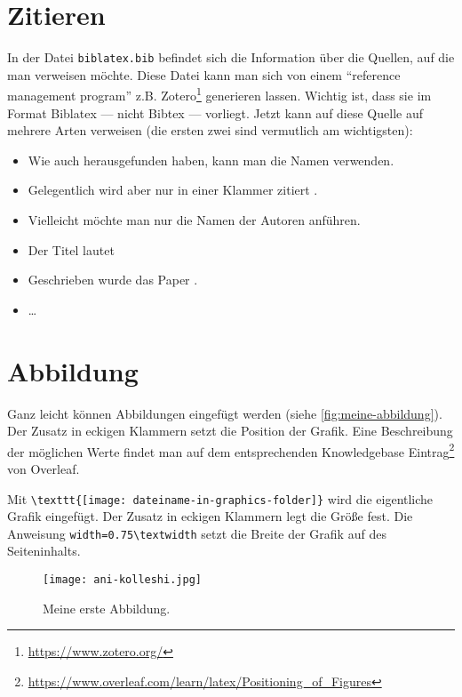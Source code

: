\section{Zitieren}

In der Datei \verb|biblatex.bib| befindet sich die Information über die Quellen, auf die man verweisen möchte. Diese Datei kann man sich von einem ``reference management program'' z.B. Zotero\footnote{\href{https://www.zotero.org/}{https://www.zotero.org/}} generieren lassen. Wichtig ist, dass sie im Format Biblatex --- nicht Bibtex --- vorliegt. Jetzt kann auf diese Quelle auf mehrere Arten verweisen (die ersten zwei sind vermutlich am wichtigsten):

\begin{itemize}
    \item Wie auch \cite{appelman_rose_1998} herausgefunden haben, kann man die Namen verwenden.
    \item Gelegentlich wird aber nur in einer Klammer zitiert \parencite{appelman_rose_1998}.
    \item Vielleicht möchte man nur die Namen der Autoren \citeauthor[hier noch ein Zusatz]{appelman_rose_1998} anführen.
    \item Der Titel lautet 
    \item Geschrieben wurde das Paper \citeyear{appelman_rose_1998}.
    \item \dots
\end{itemize}

\section{Abbildung}

Ganz leicht können Abbildungen eingefügt werden (siehe \autoref{fig:meine-abbildung}). Der Zusatz in eckigen Klammern setzt die Position der Grafik. Eine Beschreibung der möglichen Werte findet man auf dem entsprechenden Knowledgebase Eintrag\footnote{\href{https://www.overleaf.com/learn/latex/Positioning\_of\_Figures}{https://www.overleaf.com/learn/latex/Positioning\_of\_Figures}} von Overleaf.

Mit \verb|\texttt{[image: dateiname-in-graphics-folder]}| wird die eigentliche \newline Grafik eingefügt. Der Zusatz in eckigen Klammern legt die Größe fest. Die Anweisung \verb|width=0.75\textwidth| setzt die Breite der Grafik auf  des Seiteninhalts.

\begin{figure}[h]
    \centering
    \texttt{[image: ani-kolleshi.jpg]}
    \caption{Meine erste Abbildung.}
    \label{fig:meine-abbildung}
\end{figure}

